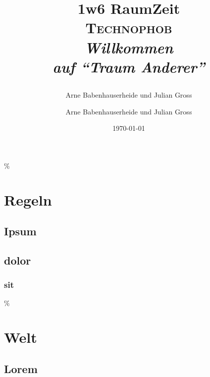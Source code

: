 \documentclass[twoside,a5paper]{memoir}
\author{Arne Babenhauserheide und Julian Gross}
\author{Arne Babenhauserheide und Julian Gross}
\date{\today}
\title{\raggedright \hspace{0.5cm} 1w6 RaumZeit \\ \centering \vspace{0.4cm} \vspace{1.50cm} \hspace{0.5cm} \HUGE \textsc{\bfseries Technophob}\LARGE \\ \vspace{0.3cm} \hspace{0.5cm} \itshape Willkommen \\ \hspace{0.5cm} auf ``Traum Anderer'' \\
}
\begin{document}
\maketitle
\newpage

\tableofcontents

\% \pagebreak

\part{Regeln}
\label{sec-1}

\chapter{Ipsum}
\label{sec-1-1}

\chapter{dolor}
\label{sec-1-2}

\section{sit}
\label{sec-1-2-1}

\lipsum*[1]

\marginpar{\lipsum*[2]}
\lipsum*[3]

\marginpar{\lipsum*[4]}
\lipsum*[5]

\% \marginpar{\lipsum*[6]}
\lipsum*[8]

\part{Welt}
\label{sec-2}

\chapter{Lorem}
\label{sec-2-1}

\lipsum*[7]


\pagebreak

\layout
\end{document}
